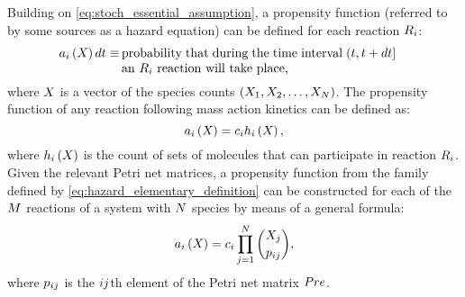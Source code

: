 Building on \eqref{eq:stoch_essential_assumption}, a propensity function (referred to by some sources as a hazard equation\supercite{Wilkinson:2012tt}) can be defined for each reaction $R_{i}$:
\begin{align}\label{eq:hazard_definition}
    \haz \dt \equiv&\, \parbox[t]{0.63\linewidth}{probability that during the time interval $\timeint$ an $\rxn$ reaction will take place,}
\end{align}
where $X_{}$ is a vector of the species counts $\left( {X}_{1}, {X}_{2}, \dots, {X}_{N} \right)$. The propensity function of any reaction following mass action kinetics can be defined as:
\begin{equation}\label{eq:hazard_elementary_definition}
    a_{i} \left( X_{} \right) = c_{i} h_{i} \left( X_{} \right),
\end{equation}
where $h_{i} \left( X_{} \right)$ is the count of sets of molecules that can participate in reaction $R_{i}$. Given the relevant Petri net matrices, a propensity function from the family defined by \eqref{eq:hazard_elementary_definition} can be constructed for each of the $M$ reactions of a system with $N$ species by means of a general formula\supercite{Wilkinson:2012tt}:
\begin{equation}\label{eq:hazard_general_formula}
    a_{i} \left( X_{} \right) = c_{i} \prod_{j=1}^{N} \binom{X_{j}}{p_{i j}},
\end{equation}
where $p_{i j}$ is the $i j$th element of the Petri net matrix $Pre$.

